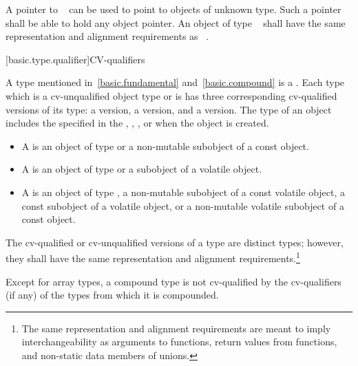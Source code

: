 \pnum
{}%
%
A pointer to \cv{}~
can be used to point to objects of
unknown type. Such a pointer shall be able to hold any object pointer.
An object of type \cv{}~
shall have the same representation and alignment
requirements as \cv{}~.

[basic.type.qualifier]{CV-qualifiers}

\pnum
{}%
%
%
A type mentioned in~\ref{basic.fundamental} and~\ref{basic.compound} is
a . Each type which is a
cv-unqualified object type or is
 has three corresponding cv-qualified
versions of its type: a  version, a
 version, and a
 version. The
type of an object includes the 
specified in the ,
,
, or
 when the object is created.
\begin{itemize}
\item A  is an object of type  or a
  non-mutable subobject of a const object.

\item A  is an object of type
   or a subobject of a volatile object.

\item A  is an object of type
  , a non-mutable subobject of a const volatile object,
  a const subobject of a volatile object, or a non-mutable volatile
  subobject of a const object.
\end{itemize}
The cv-qualified or
cv-unqualified versions of a type
are distinct types; however, they shall have the same representation and
alignment requirements.\footnote{The same representation
and alignment requirements are meant to imply
interchangeability as arguments to functions, return values from
functions, and non-static data members of unions.}

\pnum
Except for array types, a compound type is not cv-qualified by the
cv-qualifiers (if any) of the types from which it is compounded.

